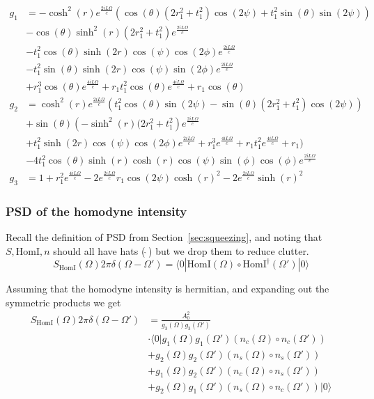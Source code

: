\documentclass[aps,pra,superscriptaddress,reprint,nofootinbib]{revtex4-1}
\begin{document}
{\small
\begin{align*}
g_1 &= -\cosh ^2(r) e^{\frac{2 i L \Omega }{c}} \left(\cos (\theta ) \left(2 r_1^2+t_1^2\right) \cos (2 \psi )+t_1^2
   \sin (\theta ) \sin (2 \psi )\right) \\
   &-\cos (\theta ) \sinh ^2(r) \left(2 r_1^2+t_1^2\right) e^{\frac{2 i L \Omega
   }{c}}\\
   &-t_1^2 \cos (\theta ) \sinh (2 r) \cos (\psi ) \cos (2 \phi ) e^{\frac{2 i L \Omega }{c}}\\
   &-t_1^2 \sin (\theta )
   \sinh (2 r) \cos (\psi ) \sin (2 \phi ) e^{\frac{2 i L \Omega }{c}}\\
   &+r_1^3 \cos (\theta ) e^{\frac{4 i L \Omega
   }{c}}+r_1 t_1^2 \cos (\theta ) e^{\frac{4 i L \Omega }{c}}+r_1 \cos (\theta ) \\
g_2 &= \cosh ^2(r) e^{\frac{2 i L \Omega }{c}} \left(t_1^2 \cos (\theta ) \sin (2 \psi )-\sin (\theta ) \left(2
   r_1^2+t_1^2\right) \cos (2 \psi )\right)\\
   &+\sin (\theta ) \left(-\sinh ^2(r) (2 r_1^2+t_1^2\right)
   e^{\frac{2 i L \Omega }{c}}\\
   &+t_1^2 \sinh (2 r) \cos (\psi ) \cos (2 \phi ) e^{\frac{2 i L \Omega }{c}}+r_1^3
   e^{\frac{4 i L \Omega }{c}}+r_1 t_1^2 e^{\frac{4 i L \Omega }{c}}+r_1)\\
   &-4 t_1^2 \cos (\theta )
   \sinh (r) \cosh (r) \cos (\psi ) \sin (\phi ) \cos (\phi ) e^{\frac{2 i L \Omega }{c}} \\
g_3 &= 1 + r_1^2 e^{\frac{4 i L \Omega}{c}} - 2 e^{\frac{2 i L \Omega}{c}} r_1 \cos(2 \psi) \cosh(r)^2 - 2 e^{\frac{2 i L \Omega}{c}} \sinh(r)^2
\end{align*}
}

\subsubsection{PSD of the homodyne intensity}

Recall the definition of PSD from Section~\ref{sec:squeezing}, and noting that $S, \mathrm{HomI}, n$ should all have hats (\,$\hat{}$\,) but we drop them to reduce clutter.
$$S_\mathrm{HomI}(\Omega) 2 \pi \delta(\Omega - \Omega') = \langle0| \mathrm{HomI}(\Omega) \circ \mathrm{HomI}^\dagger(\Omega') |0\rangle$$

Assuming that the homodyne intensity is hermitian, and expanding out the symmetric products we get
\begin{align*}
S_\mathrm{HomI}(\Omega) 2 \pi \delta(\Omega - \Omega') &= \frac{A_0^2}{g_3(\Omega) g_3(\Omega')} \\
&\cdot \langle0| g_1(\Omega) g_1(\Omega') (n_c(\Omega) \circ n_c(\Omega'))\\
&+ g_2(\Omega) g_2(\Omega') (n_s(\Omega) \circ n_s(\Omega')) \\
&+ g_1(\Omega) g_2(\Omega') (n_c(\Omega) \circ n_s(\Omega')) \\
&+ g_2(\Omega) g_1(\Omega') (n_s(\Omega) \circ n_c(\Omega')) |0\rangle
\end{align*}
\end{document}

